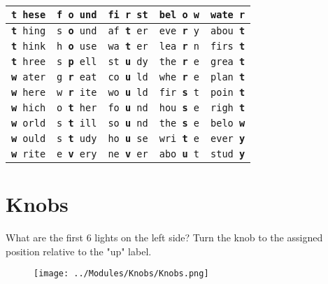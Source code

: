 \documentclass[]{article}
\begin{document}
\begin{tabular}{|l|l|l|l|l|}
\hline \rule[-1ex]{0pt}{3.5ex} \texttt{\textbf{t} hese} & \texttt{f \textbf{o} und} & \texttt{fi \textbf{r} st} & \texttt{bel \textbf{o} w} & \texttt{wate \textbf{r}} \\
\hline \rule[-1ex]{0pt}{3.5ex} \texttt{\textbf{t} hing} & \texttt{s \textbf{o} und} & \texttt{af \textbf{t} er} & \texttt{eve \textbf{r} y} & \texttt{abou \textbf{t}} \\
\hline \rule[-1ex]{0pt}{3.5ex} \texttt{\textbf{t} hink} & \texttt{h \textbf{o} use} & \texttt{wa \textbf{t} er} & \texttt{lea \textbf{r} n} & \texttt{firs \textbf{t}} \\
\hline \rule[-1ex]{0pt}{3.5ex} \texttt{\textbf{t} hree} & \texttt{s \textbf{p} ell} & \texttt{st \textbf{u} dy} & \texttt{the \textbf{r} e} & \texttt{grea \textbf{t}} \\
\hline \rule[-1ex]{0pt}{3.5ex} \texttt{\textbf{w} ater} & \texttt{g \textbf{r} eat} & \texttt{co \textbf{u} ld} & \texttt{whe \textbf{r} e} & \texttt{plan \textbf{t}} \\
\hline \rule[-1ex]{0pt}{3.5ex} \texttt{\textbf{w} here} & \texttt{w \textbf{r} ite} & \texttt{wo \textbf{u} ld} & \texttt{fir \textbf{s} t} & \texttt{poin \textbf{t}} \\
\hline \rule[-1ex]{0pt}{3.5ex} \texttt{\textbf{w} hich} & \texttt{o \textbf{t} her} & \texttt{fo \textbf{u} nd} & \texttt{hou \textbf{s} e} & \texttt{righ \textbf{t}} \\
\hline \rule[-1ex]{0pt}{3.5ex} \texttt{\textbf{w} orld} & \texttt{s \textbf{t} ill} & \texttt{so \textbf{u} nd} & \texttt{the \textbf{s} e} & \texttt{belo \textbf{w}} \\
\hline \rule[-1ex]{0pt}{3.5ex} \texttt{\textbf{w} ould} & \texttt{s \textbf{t} udy} & \texttt{ho \textbf{u} se} & \texttt{wri \textbf{t} e} & \texttt{ever \textbf{y}} \\
\hline \rule[-1ex]{0pt}{3.5ex} \texttt{\textbf{w} rite} & \texttt{e \textbf{v} ery} & \texttt{ne \textbf{v} er} & \texttt{abo \textbf{u} t} & \texttt{stud \textbf{y}} \\
\hline
\end{tabular}

\newpage
\section{Knobs}
What are the first 6 lights on the left side?
Turn the knob to the assigned position relative to the "up" label.

\begin{figure}[h!]
\texttt{[image: ../Modules/Knobs/Knobs.png]}
\end{figure}
\end{document}
